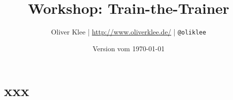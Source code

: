 \documentclass[a4paper,openany,twoside,titlepage,10pt,headsepline]{scrbook}
\author{Oliver Klee | \url{http://www.oliverklee.de/} | \texttt{@oliklee}}
\title{Workshop: Train-the-Trainer}
\date{Version vom \today}
\begin{document}
\frontmatter

\maketitle

\tableofcontents

\mainmatter

\chapter{xxx}






\backmatter
\end{document}
